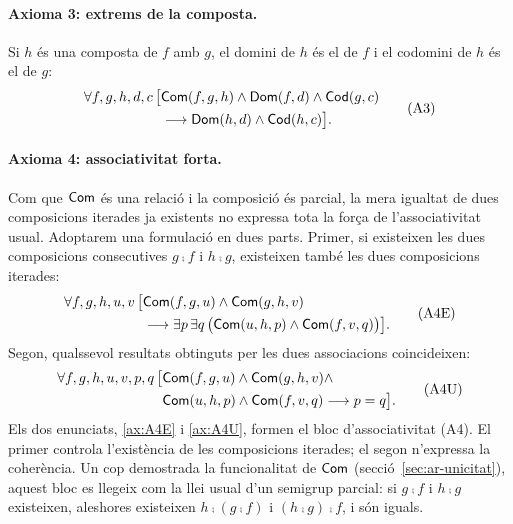 \paragraph{Axioma 3: extrems de la composta.}
Si $h$ és una composta de $f$ amb $g$, el domini de $h$ és el de $f$ i el codomini de $h$ és el de $g$:
\begin{equation}
\begin{split}
\forall f,g,h,d,c\,\bigl[
&\mathsf{Com}(f,g,h)\land\mathsf{Dom}(f,d)\land\mathsf{Cod}(g,c)\\
&\longrightarrow
\mathsf{Dom}(h,d)\land\mathsf{Cod}(h,c)
\bigr].
\end{split}
\tag{A3}\label{ax:A3}
\end{equation}

\paragraph{Axioma 4: associativitat forta.}
Com que $\mathsf{Com}$ és una relació i la composició és parcial, la mera igualtat de dues composicions iterades ja existents no expressa tota la força de l'associativitat usual. Adoptarem una formulació en dues parts. Primer, si existeixen les dues composicions consecutives $g\comp f$ i $h\comp g$, existeixen també les dues composicions iterades:
\begin{equation}
\begin{split}
\forall f,g,h,u,v\,\bigl[
&\mathsf{Com}(f,g,u)\land\mathsf{Com}(g,h,v)\\
&\longrightarrow
\exists p\,\exists q\,
\bigl(\mathsf{Com}(u,h,p)\land\mathsf{Com}(f,v,q)\bigr)
\bigr].
\end{split}
\tag{A4E}\label{ax:A4E}
\end{equation}
Segon, qualssevol resultats obtinguts per les dues associacions coincideixen:
\begin{equation}
\begin{split}
\forall f,g,h,u,v,p,q\,\bigl[
&\mathsf{Com}(f,g,u)\land\mathsf{Com}(g,h,v)\land\\
&\mathsf{Com}(u,h,p)\land\mathsf{Com}(f,v,q)
\longrightarrow p=q
\bigr].
\end{split}
\tag{A4U}\label{ax:A4U}
\end{equation}
Els dos enunciats, \eqref{ax:A4E} i \eqref{ax:A4U}, formen el bloc d'associativitat (A4). El primer controla l'existència de les composicions iterades; el segon n'expressa la coherència. Un cop demostrada la funcionalitat de $\mathsf{Com}$ (secció~\ref{sec:ar-unicitat}), aquest bloc es llegeix com la llei usual d'un semigrup parcial: si $g\comp f$ i $h\comp g$ existeixen, aleshores existeixen $h\comp(g\comp f)$ i $(h\comp g)\comp f$, i són iguals.


